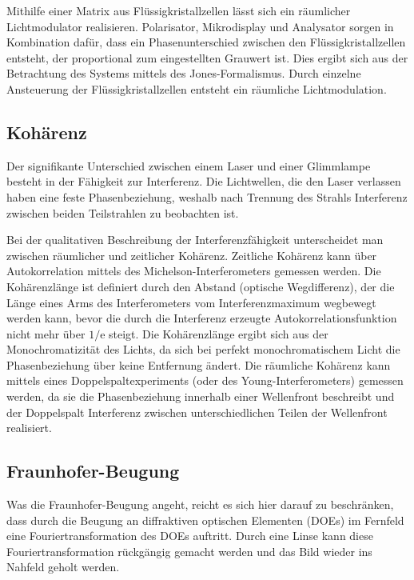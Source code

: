 \documentclass[
	a4paper,
	12pt,
	pagesize,
	ngerman
]{scrartcl}
\begin{document}
	Mithilfe einer Matrix aus Flüssigkristallzellen lässt sich ein räumlicher Lichtmodulator realisieren.
	Polarisator, Mikrodisplay und Analysator sorgen in Kombination dafür, dass ein Phasenunterschied zwischen den Flüssigkristallzellen entsteht, der proportional zum eingestellten Grauwert ist.
	Dies ergibt sich aus der Betrachtung des Systems mittels des Jones-Formalismus.
	Durch einzelne Ansteuerung der Flüssigkristallzellen entsteht ein räumliche Lichtmodulation.
	\label{chap_phasengrau}

	\subsection{Kohärenz}
	Der signifikante Unterschied zwischen einem Laser und einer Glimmlampe besteht in der Fähigkeit zur Interferenz.
	Die Lichtwellen, die den Laser verlassen haben eine feste Phasenbeziehung, weshalb nach Trennung des Strahls Interferenz zwischen beiden Teilstrahlen zu beobachten ist.

	Bei der qualitativen Beschreibung der Interferenzfähigkeit unterscheidet man zwischen räumlicher und zeitlicher Kohärenz.
	Zeitliche Kohärenz kann über Autokorrelation mittels des Michelson-Interferometers gemessen werden.
	Die Kohärenzlänge ist definiert durch den Abstand (optische Wegdifferenz), der die Länge eines Arms des Interferometers vom Interferenzmaximum wegbewegt werden kann, bevor die durch die Interferenz erzeugte Autokorrelationsfunktion nicht mehr über $1/\text{e}$ steigt.
	Die Kohärenzlänge ergibt sich aus der Monochromatizität des Lichts, da sich bei perfekt monochromatischem Licht die Phasenbeziehung über keine Entfernung ändert.
	Die räumliche Kohärenz kann mittels eines Doppelspaltexperiments (oder des Young-Interferometers) gemessen werden, da sie die Phasenbeziehung innerhalb einer Wellenfront beschreibt und der Doppelspalt Interferenz zwischen unterschiedlichen Teilen der Wellenfront realisiert.


	\subsection{Fraunhofer-Beugung}

	Was die Fraunhofer-Beugung angeht, reicht es sich hier darauf zu beschränken, dass durch die Beugung an diffraktiven optischen Elementen (DOEs) im Fernfeld eine Fouriertransformation des DOEs auftritt.
	Durch eine Linse kann diese Fouriertransformation rückgängig gemacht werden und das Bild wieder ins Nahfeld geholt werden.
\end{document}
